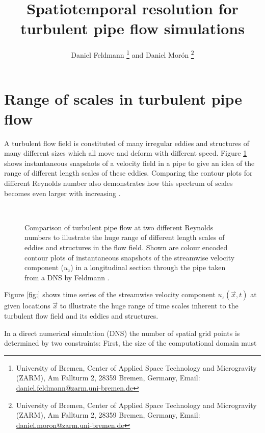 \documentclass[a4paper, 11pt, twoside, DIV=12]{scrartcl}
\title{Spatiotemporal resolution for\\ turbulent pipe flow simulations}
\subtitle{\vspace{-2.0ex}}
\author{Daniel Feldmann%
\thanks{University of Bremen,
Center of Applied Space Technology and Microgravity (ZARM),
Am Fallturm 2, 28359 Bremen, Germany,
Email: \url{daniel.feldmann@zarm.uni-bremen.de}}
and Daniel Mor\'on%
\thanks{University of Bremen,
Center of Applied Space Technology and Microgravity (ZARM),
Am Fallturm 2, 28359 Bremen, Germany,
Email: \url{daniel.moron@zarm.uni-bremen.de}}
}
\begin{document}
%
\maketitle
%
\section{Range of scales in turbulent pipe flow}
A turbulent flow field is constituted of many irregular eddies and structures of
many different sizes which all move and deform with different speed. Figure
\ref{fig:plotPipePhiCompare} shows instantaneous snapshots of a velocity field
in a pipe to give an idea of the range of different length scales of these
eddies. Comparing the contour plots for different Reynolds number also
demonstrates how this spectrum of scales becomes even larger with increasing
\Reynolds.
\begin{figure}[htb]
\centering
{}\\
\caption{Comparison of turbulent pipe flow at two different Reynolds numbers to
illustrate the huge range of different length scales of eddies and structures in
the flow field. Shown are colour encoded contour plots of instantaneous
snapshots of the streamwise velocity component ($u_z$) in a longitudinal section
through the pipe taken from a DNS by Feldmann \cite{Feldmann2015c}.}
\label{fig:plotPipePhiCompare}
\end{figure}
Figure \ref{fig:} shows time series of the streamwise velocity component
$u_z(\vec{x},t)$ at given locations $\vec{x}$ to illustrate the huge range of
time scales inherent to the turbulent flow field and its eddies and structures.
\par
In a direct numerical simulation (DNS) the number of spatial grid points is
determined by two constraints: First, the size of the computational domain must
\end{document}
